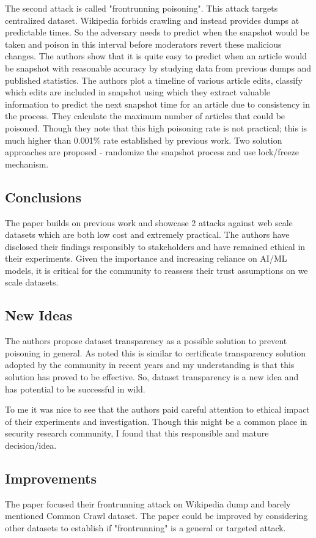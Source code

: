\documentclass[12pt]{article}
\begin{document}
    The second attack is called "frontrunning poisoning". This attack targets centralized dataset. Wikipedia forbids crawling and instead provides dumps at predictable times. So the adversary needs to predict when the snapshot would be taken and poison in this interval before moderators revert these malicious changes. The authors show that it is quite easy to predict when an article would be snapshot with reasonable accuracy by studying data from previous dumps and published statistics. The authors plot a timeline of various article edits, classify which edits are included in snapshot using which they extract valuable information to predict the next snapshot time for an article due to consistency in the process. They calculate the maximum number of articles that could be poisoned. Though they note that this high poisoning rate is not practical; this is much higher than 0.001\% rate established by previous work. Two solution approaches are proposed - randomize the snapshot process and use lock/freeze mechanism.
    
    \subsection*{Conclusions}
    The paper builds on previous work and showcase 2 attacks against web scale datasets which are both low cost and extremely practical. The authors have disclosed their findings responsibly to stakeholders and have remained ethical in their experiments. Given the importance and increasing reliance on AI/ML models, it is critical for the community to reassess their trust assumptions on we scale datasets.

    \subsection*{New Ideas}
    The authors propose dataset transparency as a possible solution to prevent poisoning in general. As noted this is similar to certificate transparency solution adopted by the community in recent years and my understanding is that this solution has proved to be effective. So, dataset transparency is a new idea and has potential to be successful in wild.

    To me it was nice to see that the authors paid careful attention to ethical impact of their experiments and investigation. Though this might be a common place in security research community, I found that this responsible and mature decision/idea.

    \subsection*{Improvements}
    The paper focused their frontrunning attack on Wikipedia dump and barely mentioned Common Crawl dataset. The paper could be improved by considering other datasets to establish if "frontrunning" is a general or targeted attack.
\end{document}
